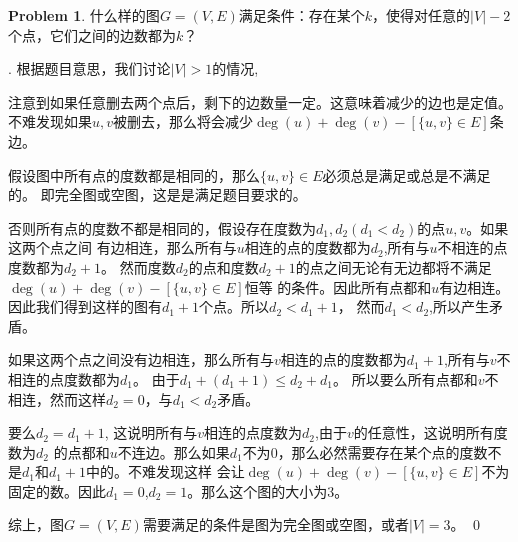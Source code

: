 \documentclass[UTF8]{ctexart}
\newenvironment{sol}
  {\par\vspace{3mm}\noindent{\it Solution}.}
  {\qed \\ \medskip}
\theoremstyle{definition}
\newtheorem{problem}{Problem}
\begin{document}
\begin{problem}
什么样的图$G=(V,E)$满足条件：存在某个$k$，使得对任意的$|V|-2$个点，它们之间的边数都为$k$？
\begin{sol}
  根据题目意思，我们讨论$|V|>1$的情况,

  注意到如果任意删去两个点后，剩下的边数量一定。这意味着减少的边也是定值。
  不难发现如果$u,v$被删去，那么将会减少$\deg(u) + \deg(v) - [\{u, v\} \in E]$条边。
  
  假设图中所有点的度数都是相同的，那么$\{u, v\} \in E$必须总是满足或总是不满足的。
  即完全图或空图，这是是满足题目要求的。

  否则所有点的度数不都是相同的，假设存在度数为$d_1, d_2(d_1<d_2)$的点$u,v$。如果这两个点之间
  有边相连，那么所有与$u$相连的点的度数都为$d_2$,所有与$u$不相连的点度数都为$d_2+1$。
  然而度数$d_2$的点和度数$d_2+1$的点之间无论有无边都将不满足$\deg(u) + \deg(v) - [\{u, v\} \in E]$恒等
  的条件。因此所有点都和$u$有边相连。因此我们得到这样的图有$d_1+1$个点。所以$d_2 < d_1+1$，
  然而$d_1<d_2$,所以产生矛盾。

  如果这两个点之间没有边相连，那么所有与$v$相连的点的度数都为$d_1+1$,所有与$v$不相连的点度数都为$d_1$。
  由于$d_1 + (d_1+1) \leq d_2 + d_1$。
  所以要么所有点都和$v$不相连，然而这样$d_2=0$，与$d_1<d_2$矛盾。

  要么$d_2 = d_1 + 1$, 这说明所有与$v$相连的点度数为$d_2$,由于$v$的任意性，这说明所有度数为$d_2$
  的点都和$u$不连边。那么如果$d_1$不为$0$，那么必然需要存在某个点的度数不是$d_1$和$d_1+1$中的。不难发现这样
  会让$\deg(u) + \deg(v) - [\{u, v\} \in E]$不为固定的数。因此$d_1=0$,$d_2=1$。那么这个图的大小为$3$。

  综上，图$G=(V,E)$需要满足的条件是图为完全图或空图，或者$|V|=3$。
\end{sol}
\end{problem}
\end{document}
